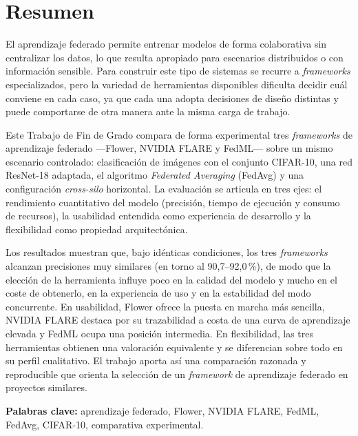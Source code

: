 \cleardoublepage

\chapter*{Resumen}

El aprendizaje federado permite entrenar modelos de forma colaborativa sin centralizar los datos, lo que resulta apropiado para escenarios distribuidos o con información sensible. Para construir este tipo de sistemas se recurre a \textit{frameworks} especializados, pero la variedad de herramientas disponibles dificulta decidir cuál conviene en cada caso, ya que cada una adopta decisiones de diseño distintas y puede comportarse de otra manera ante la misma carga de trabajo.

Este Trabajo de Fin de Grado compara de forma experimental tres \textit{frameworks} de aprendizaje federado —Flower, NVIDIA FLARE y FedML— sobre un mismo escenario controlado: clasificación de imágenes con el conjunto CIFAR-10, una red ResNet-18 adaptada, el algoritmo \textit{Federated Averaging} (FedAvg) y una configuración \textit{cross-silo} horizontal. La evaluación se articula en tres ejes: el rendimiento cuantitativo del modelo (precisión, tiempo de ejecución y consumo de recursos), la usabilidad entendida como experiencia de desarrollo y la flexibilidad como propiedad arquitectónica.

Los resultados muestran que, bajo idénticas condiciones, los tres \textit{frameworks} alcanzan precisiones muy similares (en torno al 90,7--92,0\,\%), de modo que la elección de la herramienta influye poco en la calidad del modelo y mucho en el coste de obtenerlo, en la experiencia de uso y en la estabilidad del modo concurrente. En usabilidad, Flower ofrece la puesta en marcha más sencilla, NVIDIA FLARE destaca por su trazabilidad a costa de una curva de aprendizaje elevada y FedML ocupa una posición intermedia. En flexibilidad, las tres herramientas obtienen una valoración equivalente y se diferencian sobre todo en su perfil cualitativo. El trabajo aporta así una comparación razonada y reproducible que orienta la selección de un \textit{framework} de aprendizaje federado en proyectos similares.

\textbf{Palabras clave:} aprendizaje federado, Flower, NVIDIA FLARE, FedML, FedAvg, CIFAR-10, comparativa experimental.

